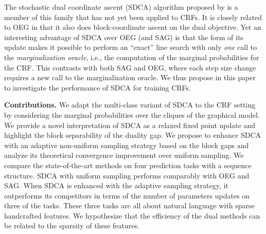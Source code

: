 The stochastic dual coordinate ascent (SDCA) algorithm proposed by \citet{shalev-shwartz_stochastic_2013,shalev2016accelerated} is a member of this family that has not yet been applied to CRFs.
It is closely related to OEG in that it also does block-coordinate ascent on the dual objective.
Yet an interesting advantage of SDCA over OEG (and SAG) is that the form of its update makes it possible to perform an ``exact'' line search with only \emph{one} call to the \emph{marginalization oracle}, i.e., the computation of the marginal probabilities for the CRF.
This contrasts with both SAG and OEG, where each step size change requires a new call to the marginalization oracle.
We thus propose in this paper to investigate the performance of SDCA for training CRFs.

\textbf{Contributions.} We adapt the multi-class variant of SDCA to the CRF setting by considering the marginal probabilities over the cliques of the graphical model.
We provide a novel interpretation of SDCA as a relaxed fixed point update and highlight the block separability of the duality gap.
We propose to enhance SDCA with an adaptive non-uniform sampling strategy based on the block gaps and analyze its theoretical convergence improvement over uniform sampling.
We compare the state-of-the-art methods on four prediction tasks with a sequence structure.
SDCA with uniform sampling performs comparably with OEG and SAG.
When SDCA is enhanced with the adaptive sampling strategy, it outperforms its competitors in terms of the number of parameters updates on three of the tasks.
These three tasks are all about natural language with sparse handcrafted features.
We hypothesize that the efficiency of the dual methods can be related to the sparsity of these features.

